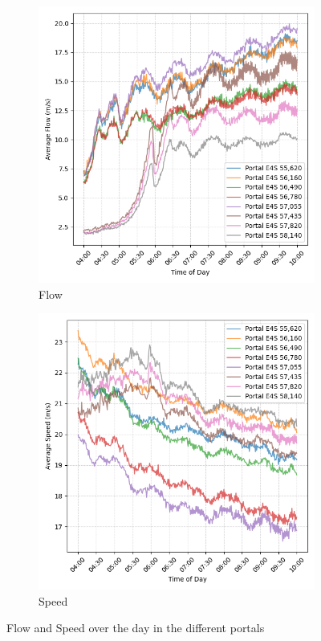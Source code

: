 	\begin{figure}[H]
		\centering
		\begin{subfigure}{0.49 \linewidth}
			\includegraphics[width=\textwidth]{../Plots/Flow/flow_comparison_portals}
			\caption{Flow}
		\end{subfigure}
		\begin{subfigure}{0.49 \linewidth}
			\includegraphics[width=\textwidth]{../Plots/Speed/speed_comparison_portals}
			\caption{Speed}
		\end{subfigure}
		\caption{Flow and Speed over the day in the different portals }
		\label{fig:speed_and_flow_portals}
	\end{figure}
	
